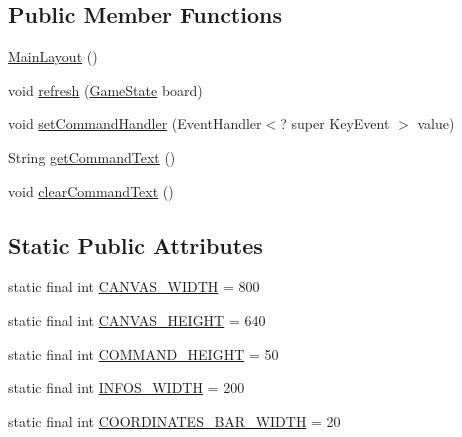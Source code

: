 \subsection*{Public Member Functions}
\begin{DoxyCompactItemize}
\item 
\mbox{\hyperlink{classui_1_1_u_i_elements_1_1_main_layout_aac19d26e23fe64414f1d40e154368a4e}{Main\+Layout}} ()
\item 
void \mbox{\hyperlink{classui_1_1_u_i_elements_1_1_main_layout_a7714bf456435ac3ab559b3bf6182c022}{refresh}} (\mbox{\hyperlink{classgame_1_1game_state_1_1_game_state}{Game\+State}} board)
\item 
void \mbox{\hyperlink{classui_1_1_u_i_elements_1_1_main_layout_a0e8ef77920e90c1c2243ba9510756c8d}{set\+Command\+Handler}} (Event\+Handler$<$? super Key\+Event $>$ value)
\item 
String \mbox{\hyperlink{classui_1_1_u_i_elements_1_1_main_layout_acb9c306f6b806c4375e19e28316f191f}{get\+Command\+Text}} ()
\item 
void \mbox{\hyperlink{classui_1_1_u_i_elements_1_1_main_layout_a69ccd44b8c5a12e7a8291e49543a3f2b}{clear\+Command\+Text}} ()
\end{DoxyCompactItemize}
\subsection*{Static Public Attributes}
\begin{DoxyCompactItemize}
\item 
static final int \mbox{\hyperlink{classui_1_1_u_i_elements_1_1_main_layout_aadf8703624fed6af51123a795862fc69}{C\+A\+N\+V\+A\+S\+\_\+\+W\+I\+D\+TH}} = 800
\item 
static final int \mbox{\hyperlink{classui_1_1_u_i_elements_1_1_main_layout_a385eac3c98534b80af934e5e3d00ca09}{C\+A\+N\+V\+A\+S\+\_\+\+H\+E\+I\+G\+HT}} = 640
\item 
static final int \mbox{\hyperlink{classui_1_1_u_i_elements_1_1_main_layout_a964e9f38054ecf71751dbe66cfd4e6e1}{C\+O\+M\+M\+A\+N\+D\+\_\+\+H\+E\+I\+G\+HT}} = 50
\item 
static final int \mbox{\hyperlink{classui_1_1_u_i_elements_1_1_main_layout_a17cd9599829d3e6739f81f34f9364460}{I\+N\+F\+O\+S\+\_\+\+W\+I\+D\+TH}} = 200
\item 
static final int \mbox{\hyperlink{classui_1_1_u_i_elements_1_1_main_layout_a4bc87545921488e1d37c3636582d63f8}{C\+O\+O\+R\+D\+I\+N\+A\+T\+E\+S\+\_\+\+B\+A\+R\+\_\+\+W\+I\+D\+TH}} = 20
\end{DoxyCompactItemize}
